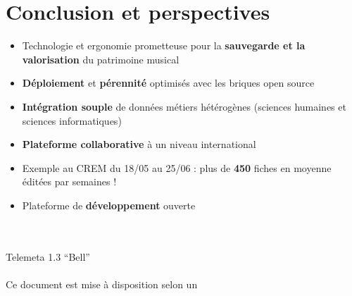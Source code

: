 \documentclass[a4paper,11pt,french]{article}
\begin{document}
\section{Conclusion et perspectives}

\begin{itemize}
 \item Technologie et ergonomie prometteuse pour la \textbf{sauvegarde et la valorisation} du patrimoine musical
 \item \textbf{Déploiement} et \textbf{pérennité} optimisés avec les briques open source
 \item \textbf{Intégration souple} de données métiers hétérogènes (sciences humaines et sciences informatiques)
 \item \textbf{Plateforme collaborative} à un niveau international
 \item Exemple au CREM du 18/05 au 25/06 : plus de \textbf{450} fiches en moyenne éditées par semaines !
 \item Plateforme de \textbf{développement} ouverte
\end{itemize}


\newpage

 \begin{center}
   \vspace{-0.2cm}
    \\
    \\
  \vspace{1cm}
   Telemeta 1.3 ``Bell''\\
   \\
    \vspace{10mm}
    \tiny{Ce document est mise à disposition selon un }
  \end{center}
\end{document}
